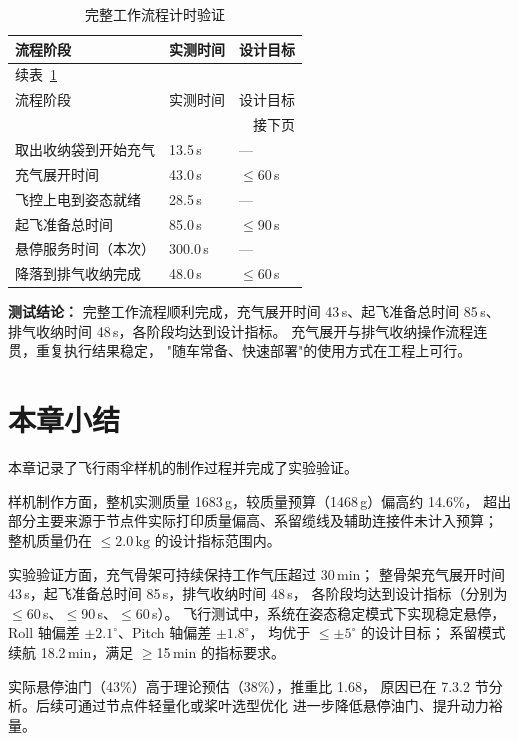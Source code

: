 \begin{longtable}{p{4.8cm} p{2.8cm} p{3.0cm}}
    \caption{完整工作流程计时验证}
    \label{tab:workflow_result} \\

    \toprule
    流程阶段 & 实测时间 & 设计目标 \\
    \midrule
    \endfirsthead

    \multicolumn{3}{l}{\small 续表~\ref*{tab:workflow_result}} \\[2pt]
    \toprule
    流程阶段 & 实测时间 & 设计目标 \\
    \midrule
    \endhead

    \midrule
    \multicolumn{3}{r}{\small 接下页} \\
    \endfoot

    \bottomrule
    \endlastfoot

    取出收纳袋到开始充气  & 13.5\,s  & —            \\[3pt]
    充气展开时间          & 43.0\,s  & $\leq 60$\,s \\[3pt]
    飞控上电到姿态就绪    & 28.5\,s  & —            \\[3pt]
    起飞准备总时间        & 85.0\,s  & $\leq 90$\,s \\[3pt]
    悬停服务时间（本次）  & 300.0\,s & —            \\[3pt]
    降落到排气收纳完成    & 48.0\,s  & $\leq 60$\,s \\

\end{longtable}

\textbf{测试结论：}
完整工作流程顺利完成，充气展开时间 43\,s、起飞准备总时间 85\,s、
排气收纳时间 48\,s，各阶段均达到设计指标。
充气展开与排气收纳操作流程连贯，重复执行结果稳定，
"随车常备、快速部署"的使用方式在工程上可行。


\section{本章小结}

本章记录了飞行雨伞样机的制作过程并完成了实验验证。

样机制作方面，整机实测质量 1683\,g，较质量预算（1468\,g）偏高约 14.6\%，
超出部分主要来源于节点件实际打印质量偏高、系留缆线及辅助连接件未计入预算；
整机质量仍在 $\leq 2.0\,\text{kg}$ 的设计指标范围内。

实验验证方面，充气骨架可持续保持工作气压超过 30\,min；
整骨架充气展开时间 43\,s，起飞准备总时间 85\,s，排气收纳时间 48\,s，
各阶段均达到设计指标（分别为 $\leq$60\,s、$\leq$90\,s、$\leq$60\,s）。
飞行测试中，系统在姿态稳定模式下实现稳定悬停，
Roll 轴偏差 $\pm2.1^\circ$、Pitch 轴偏差 $\pm1.8^\circ$，
均优于 $\leq\pm5^\circ$ 的设计目标；
系留模式续航 18.2\,min，满足 $\geq$15\,min 的指标要求。

实际悬停油门（43\%）高于理论预估（38\%），推重比 1.68，
原因已在 7.3.2 节分析。后续可通过节点件轻量化或桨叶选型优化
进一步降低悬停油门、提升动力裕量。